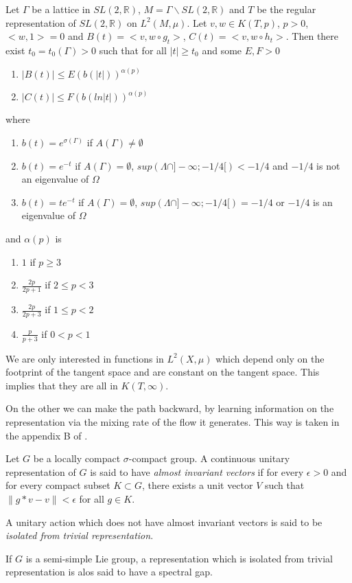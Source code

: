 \begin{thm}
Let $\Gamma$ be a lattice in $SL(2,\mathbb{R})$, $M=\Gamma \backslash SL(2,\mathbb{R})$ and $T$ be the regular representation of $SL(2,\mathbb{R})$ on $L^2 (M, \mu)$. Let $v,w\in K(T,p)$, $p>0$, $<w,1>=0$ and $B(t)=<v,w \circ g_t>$, $C(t)=<v,w \circ h_t>$.
Then there exist $t_0=t_0(\Gamma)>0$ such that for all $|t| \geq t_0$ and some $E,F > 0$
\begin{enumerate}
\item $|B(t)| \leq E( b(|t|))^{\alpha(p)}$
\item $|C(t)| \leq F( b(ln|t|))^{\alpha(p)}$
\end{enumerate}
where

\begin{enumerate}
\item $b(t)=e^{\sigma(\Gamma)}$ if $A(\Gamma) \neq \emptyset$
\item $b(t)=e^{-t}$ if $A(\Gamma) = \emptyset$, $sup(\Lambda \cap ]- \infty; -1/4[) < -1/4$ and $-1/4$ is not an eigenvalue of $\Omega$
\item $b(t)=te^{-t}$ if $A(\Gamma) = \emptyset$, $sup(\Lambda \cap ]- \infty; -1/4[)= -1/4$ or $-1/4$ is an eigenvalue of $\Omega$
\end{enumerate}
and $\alpha(p)$ is
\begin{enumerate}
\item $1$ if $p \geq 3$
\item $\frac{2p}{2p+1}$ if $2 \leq p < 3$
\item $\frac{2p}{2p+3}$ if $1 \leq p < 2$
\item $\frac{p}{p+3}$ if $0<p<1$
\end{enumerate}
\end{thm}

\begin{rmq}
We are only interested in functions in $L^2(X,\mu)$ which depend only on the footprint of the tangent space and are constant on the tangent space. This implies that they are all in $K(T,\infty)$.
\end{rmq}

On the other we can make the path backward, by learning information on the representation via the mixing rate of the flow it generates. This way is taken in the appendix B of \cite{2005math.....11614A}.

\begin{dfnt}
Let $G$ be a locally compact $\sigma$-compact group. A continuous unitary
 representation of $G$ is said to have \emph{almost invariant vectors}
 if for every $\epsilon > 0$ and for every compact subset $K \subset G$, there exists a unit vector $V$ such that $\|g*v-v\| < \epsilon$ for all $g \in K$.

 A unitary action which does not have almost invariant vectors is said to be \emph{isolated from trivial representation}.

 If $G$ is a semi-simple Lie group, a representation which is isolated from trivial representation is alos said to have a spectral gap.
\end{dfnt}

